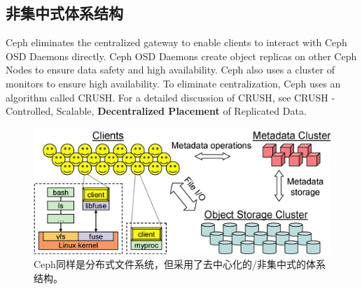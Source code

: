 \documentclass[logo,reportComp]{thesis}
\begin{document}
\subsection{非集中式体系结构}
\begin{flushleft}
Ceph eliminates the centralized gateway to enable clients to interact with Ceph OSD Daemons directly. Ceph OSD Daemons create object replicas on other Ceph Nodes to ensure data safety and high availability. Ceph also uses a cluster of monitors to ensure high availability. To eliminate centralization, Ceph uses an algorithm called CRUSH. For a detailed discussion of CRUSH, see CRUSH - Controlled, Scalable, \textbf{Decentralized Placement} of Replicated Data.
\end{flushleft}
\begin{figure}[H]
\centering
\includegraphics[width=0.8\linewidth]{fig/ceph.png}
\caption{Ceph\cite{bib:ceph}同样是分布式文件系统，但采用了去中心化的/非集中式的体系结构。}
\end{figure}
\end{document}
